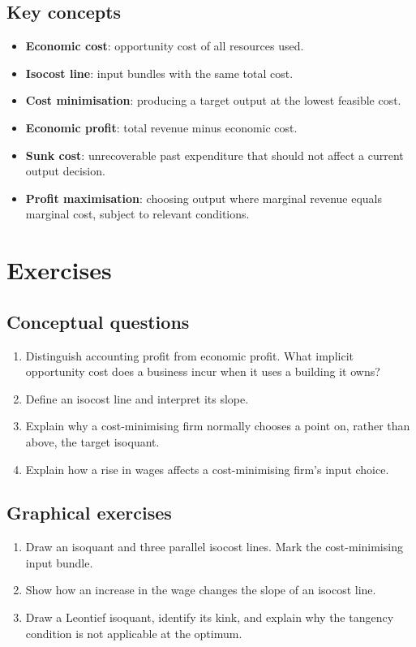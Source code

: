 \subsection*{Key concepts}
\begin{itemize}
  \item \textbf{Economic cost}: opportunity cost of all resources used.
  \item \textbf{Isocost line}: input bundles with the same total cost.
  \item \textbf{Cost minimisation}: producing a target output at the lowest feasible cost.
  \item \textbf{Economic profit}: total revenue minus economic cost.
  \item \textbf{Sunk cost}: unrecoverable past expenditure that should not affect a current output decision.
  \item \textbf{Profit maximisation}: choosing output where marginal revenue equals marginal cost, subject to relevant conditions.
\end{itemize}

\section*{Exercises}

\subsection*{Conceptual questions}
\begin{enumerate}[label=\arabic*.]
  \item Distinguish accounting profit from economic profit. What implicit opportunity cost does a business incur when it uses a building it owns?
  \item Define an isocost line and interpret its slope.
  \item Explain why a cost-minimising firm normally chooses a point on, rather than above, the target isoquant.
  \item Explain how a rise in wages affects a cost-minimising firm's input choice.
\end{enumerate}

\subsection*{Graphical exercises}
\begin{enumerate}[resume,label=\arabic*.]
  \item Draw an isoquant and three parallel isocost lines. Mark the cost-minimising input bundle.
  \item Show how an increase in the wage changes the slope of an isocost line.
  \item Draw a Leontief isoquant, identify its kink, and explain why the tangency condition is not applicable at the optimum.
\end{enumerate}


